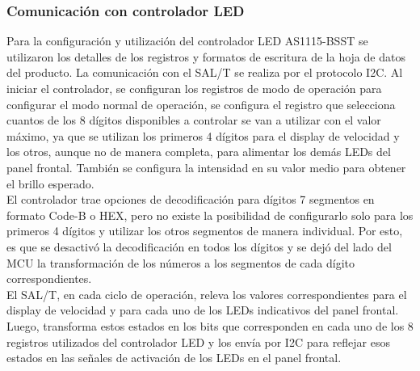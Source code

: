 \subsubsection{Comunicación con controlador LED}

Para la configuración y utilización del controlador LED AS1115-BSST se utilizaron los detalles de los registros y formatos de escritura de la hoja de datos del producto. La comunicación con el SAL/T se realiza por el protocolo I2C. Al iniciar el controlador, se configuran los registros de modo de operación para configurar el modo normal de operación, se configura el registro que selecciona cuantos de los 8 dígitos disponibles a controlar se van a utilizar con el valor máximo, ya que se utilizan los primeros 4 dígitos para el display de velocidad y los otros, aunque no de manera completa, para alimentar los demás LEDs del panel frontal. También se configura la intensidad en su valor medio para obtener el brillo esperado. \\

El controlador trae opciones de decodificación para dígitos 7 segmentos en formato Code-B o HEX, pero no existe la posibilidad de configurarlo solo para los primeros 4 dígitos y utilizar los otros segmentos de manera individual. Por esto, es que se desactivó la decodificación en todos los dígitos y se dejó del lado del MCU la transformación de los números a los segmentos de cada dígito correspondientes.  \\ 


El SAL/T, en cada ciclo de operación, releva los valores correspondientes para el display de velocidad y para cada uno de los LEDs indicativos del panel frontal. Luego, transforma estos estados en los bits que corresponden en cada uno de los 8 registros utilizados del controlador LED y los envía por I2C para reflejar esos estados en las señales de activación de los LEDs en el panel frontal. 

